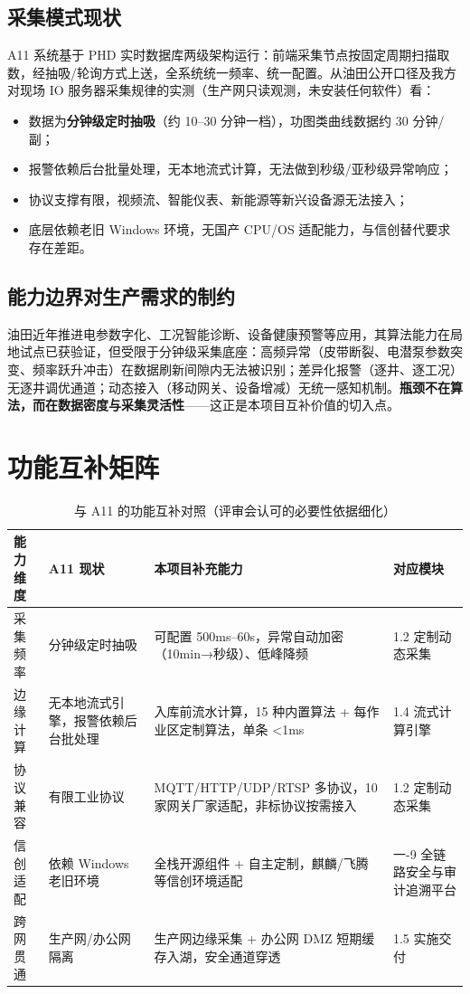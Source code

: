 \documentclass[11pt,a4paper]{ctexart}
\begin{document}
\subsection{采集模式现状}

A11 系统基于 PHD 实时数据库两级架构运行：前端采集节点按固定周期扫描取数，经抽吸/轮询方式上送，全系统统一频率、统一配置。从油田公开口径及我方对现场 IO 服务器采集规律的实测（生产网只读观测，未安装任何软件）看：

\begin{itemize}[leftmargin=*]
  \item 数据为\textbf{分钟级定时抽吸}（约 10--30 分钟一档），功图类曲线数据约 30 分钟/副；
  \item 报警依赖后台批量处理，无本地流式计算，无法做到秒级/亚秒级异常响应；
  \item 协议支撑有限，视频流、智能仪表、新能源等新兴设备源无法接入；
  \item 底层依赖老旧 Windows 环境，无国产 CPU/OS 适配能力，与信创替代要求存在差距。
\end{itemize}

\subsection{能力边界对生产需求的制约}

油田近年推进电参数字化、工况智能诊断、设备健康预警等应用，其算法能力在局地试点已获验证，但受限于分钟级采集底座：高频异常（皮带断裂、电潜泵参数突变、频率跃升冲击）在数据刷新间隙内无法被识别；差异化报警（逐井、逐工况）无逐井调优通道；动态接入（移动网关、设备增减）无统一感知机制。\textbf{瓶颈不在算法，而在数据密度与采集灵活性}——这正是本项目互补价值的切入点。

\section{功能互补矩阵}

\begin{table}[H]\centering
\caption{与 A11 的功能互补对照（评审会认可的必要性依据细化）}
\begin{tabular}{p{2.6cm} p{4.2cm} p{4.2cm} p{2.6cm}}
\toprule
\textbf{能力维度} & \textbf{A11 现状} & \textbf{本项目补充能力} & \textbf{对应模块} \\
\midrule
采集频率 & 分钟级定时抽吸 & 可配置 500ms--60s，异常自动加密（10min→秒级）、低峰降频 & 1.2 定制动态采集 \\
边缘计算 & 无本地流式引擎，报警依赖后台批处理 & 入库前流水计算，15 种内置算法 + 每作业区定制算法，单条 <1ms & 1.4 流式计算引擎 \\
协议兼容 & 有限工业协议 & MQTT/HTTP/UDP/RTSP 多协议，10 家网关厂家适配，非标协议按需接入 & 1.2 定制动态采集 \\
信创适配 & 依赖 Windows 老旧环境 & 全栈开源组件 + 自主定制，麒麟/飞腾等信创环境适配 & 一-9 全链路安全与审计追溯平台 \\
跨网贯通 & 生产网/办公网隔离 & 生产网边缘采集 + 办公网 DMZ 短期缓存入湖，安全通道穿透 & 1.5 实施交付 \\
\bottomrule
\end{tabular}
\end{table}
\end{document}
